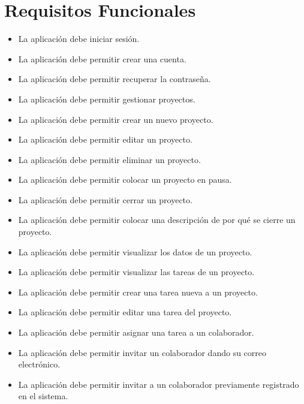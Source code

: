 \section{Requisitos Funcionales}
\begin{itemize}
\item La aplicación debe iniciar sesión. 

\item La aplicación debe permitir crear una cuenta. 

\item La aplicación debe permitir recuperar la contraseña. 

\item La aplicación debe permitir gestionar proyectos. 

\item La aplicación debe permitir crear un nuevo proyecto. 

\item La aplicación debe permitir editar un proyecto. 

\item La aplicación debe permitir eliminar un proyecto. 

\item La aplicación debe permitir colocar un proyecto en pausa. 

\item La aplicación debe permitir cerrar un proyecto. 

\item La aplicación debe permitir colocar una descripción de por qué se cierre un proyecto. 

\item La aplicación debe permitir visualizar los datos de un proyecto. 

\item La aplicación debe permitir visualizar las tareas de un proyecto. 

\item La aplicación debe permitir crear una tarea nueva a un proyecto. 

\item La aplicación debe permitir editar una tarea del proyecto. 

\item La aplicación debe permitir asignar una tarea a un colaborador. 

\item La aplicación debe permitir invitar un colaborador dando su correo electrónico. 

\item La aplicación debe permitir invitar a un colaborador previamente registrado en el sistema. 
\end{itemize}


